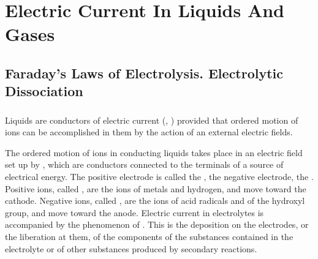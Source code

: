 





\chapter{Electric Current In Liquids And Gases}
\label{ch-22}

\section{Faraday's Laws of Electrolysis. Electrolytic Dissociation}
\label{sec-22.1}

\subsection{}\label{22.1.1} 
Liquids are conductors of electric current (, ) provided that ordered motion of ions can be accomplished in them by the action of an external electric fields.

The ordered motion of ions in conducting liquids takes place in an electric field set up by , which are conductors connected to the terminals of a source of electrical energy. The positive electrode is called the , the negative electrode, the . Positive ions, called , are the ions of metals and hydrogen, and move toward the cathode. Negative ions, called , are the ions of acid radicals and of the hydroxyl group, and move toward the anode. Electric current in electrolytes is accompanied by the phenomenon of . This is the deposition on the electrodes, or the liberation at them, of the components of the substances contained in the electrolyte or of other substances produced by secondary reactions.

